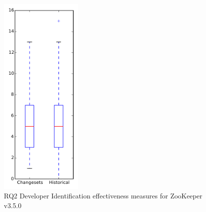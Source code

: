 
\begin{figure}[t]
\centering
\includegraphics[width=0.36\textwidth]{figures/dit/rq2_zookeeper}
\caption{RQ2 Developer Identification effectiveness measures for ZooKeeper v3.5.0}
\label{fig:dit:rq2:zookeeper}
\end{figure}
